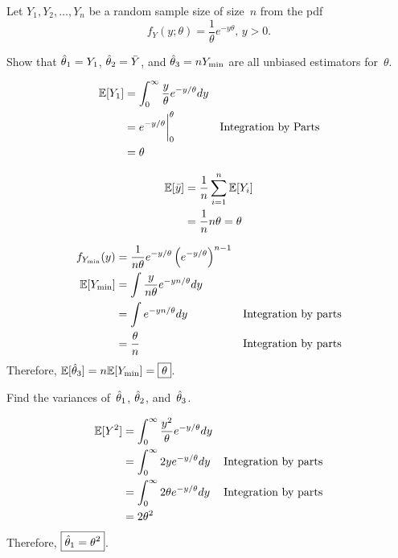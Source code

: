 \begin{problem}
  Let ${Y_1,Y_2,\ldots,Y_n}$ be a random sample size of size~$n$ from the pdf
  \begin{equation}
    f_Y(y;\theta) = \frac{1}{\theta}e^{-y\theta}\text{, }y > 0 \text{.}
  \end{equation}
\end{problem}

\begin{subproblem}
  Show that ${\hat{\theta}_{1} = Y_1}$, ${\hat{\theta}_{2} = \bar{Y}}$, and ${\hat{\theta}_{3} = nY_{\min}}$ are all unbiased estimators for~$\theta$.
\end{subproblem}

\begin{align}
  \mathbb{E}\lbrack Y_1\rbrack &= \int_{0}^{\infty} \frac{y}{\theta} e^{-y/\theta}dy \\
               &= e^{-y/\theta} \bigg\vert_{0}^{\theta} & \text{Integration by Parts}\\
               &= \theta
\end{align}

\begin{align}
  \mathbb{E}\lbrack\bar{y}\rbrack &= \frac{1}{n} \sum_{i=1}^{n} \mathbb{E}\lbrack Y_i\rbrack \\
                   &= \frac{1}{n} n\theta = \theta
\end{align}

\begin{align}
  f_{Y_{\min}}(y) &= \frac{1}{n\theta}e^{-y/\theta}\left(e^{-y/\theta}\right)^{n-1} \\
  \mathbb{E}\lbrack Y_{\min}\rbrack &= \int \frac{y}{n\theta} e^{-yn/\theta} dy \\
                    &= \int e^{-yn/\theta} dy & \text{Integration by parts} \\
                    &= \frac{\theta}{n}  & \text{Integration by parts}
\end{align}
Therefore, ${\mathbb{E}\lbrack\hat{\theta}_{3}\rbrack = n\mathbb{E}\lbrack Y_{\min}\rbrack = \boxed{\theta}}$.

\begin{subproblem}
  Find the variances of~$\hat{\theta}_{1}$, $\hat{\theta}_{2}$, and~$\hat{\theta}_{3}$.
\end{subproblem}

\begin{align}
  \mathbb{E}\lbrack Y^2\rbrack &= \int_{0}^{\infty} \frac{y^2}{\theta} e^{-y/\theta}dy \\
               &= \int_{0}^{\infty} 2y e^{-y/\theta}dy & \text{Integration by parts}\\
               &= \int_{0}^{\infty} 2\theta e^{-y/\theta}dy & \text{Integration by parts}\\
               &= 2\theta^{2}
\end{align}
Therefore, ${\boxed{\hat{\theta}_{1} = \theta^2}}$.

